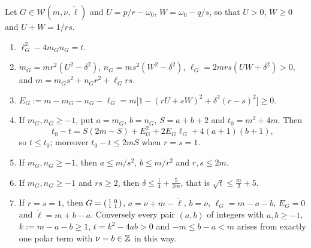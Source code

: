 \begin{lemma}\label{lem:walls}
Let $G\in\mathcal W(m,\nu,\tilde\ell)$ and $U=p/r-\omega_0$, $W=\omega_0-q/s$, so that $U>0$, $W\ge0$ and $U+W=1/rs$.
\begin{enumerate}
\item[(i)] $\ell_G^2-4m_Gn_G=t$.
\item[(ii)] $m_G=mr^2(U^2-\delta^2)$, $n_G=ms^2(W^2-\delta^2)$, $\ell_G=2mrs(UW+\delta^2)>0$, and $m=m_Gs^2+n_Gr^2+\ell_Grs$.
\item[(iii)] $E_G:=m-m_G-n_G-\ell_G=m\big[1-(rU+sW)^2+\delta^2(r-s)^2\big]\ge0$.
\item[(iv)] If $m_G,n_G\ge-1$, put $a=m_G$, $b=n_G$, $S=a+b+2$ and $t_0=m^2+4m$. Then
\begin{equation}\label{eq:t0t}
t_0-t=S(2m-S)+E_G^2+2E_G\ell_G+4(a+1)(b+1),
\end{equation}
so $t\le t_0$; moreover $t_0-t\le2mS$ when $r=s=1$.
\item[(v)] If $m_G,n_G\ge-1$, then $a\le m/s^2$, $b\le m/r^2$ and $r,s\le2m$.
\item[(vi)] If $m_G,n_G\ge-1$ and $rs\ge2$, then $\delta\le\frac14+\frac5{2m}$, that is $\sqrt t\le\frac m2+5$.
\item[(vii)] If $r=s=1$, then $G=\begin{psmallmatrix}1&0\\1&1\end{psmallmatrix}$, $a=\nu+m-\tilde\ell$, $b=\nu$, $\ell_G=m-a-b$, $E_G=0$ and $\tilde\ell=m+b-a$. Conversely every pair $(a,b)$ of integers with $a,b\ge-1$, $k:=m-a-b\ge1$, $t=k^2-4ab>0$ and $-m\le b-a<m$ arises from exactly one polar term with $\nu=b\in\mathbb{Z}$ in this way.
\end{enumerate}
\end{lemma}

